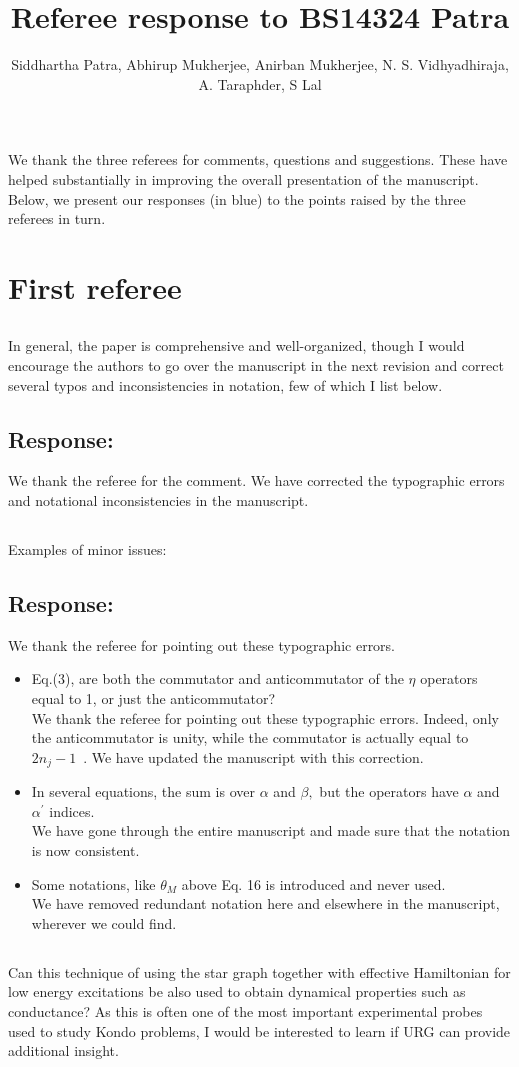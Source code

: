 \documentclass[11pt]{article}
\author{Siddhartha Patra, Abhirup Mukherjee, Anirban Mukherjee, N. S. Vidhyadhiraja,\\ A. Taraphder, S Lal}
\title{Referee response to BS14324 Patra}
\newcommand{\response}[1]{{\color{blue}\subsection*{Response:}{#1}}}
\newcommand{\point}[1]{\subsection{}{#1}}
\begin{document}
\maketitle

We thank the three referees for comments, questions and suggestions. These have helped substantially in improving the overall presentation of the manuscript. Below, we present our responses (in blue) to the points raised by the three referees in turn.

\section{First referee}

\point{In general, the paper is comprehensive and well-organized, though I would encourage the authors to go over the manuscript in the next revision and correct several typos and inconsistencies in notation, few of which I list below.}
\response{We thank the referee for the comment. We have corrected the typographic errors and notational inconsistencies in the manuscript.} 

\point{
Examples of minor issues:
\response{ We thank the referee for pointing out these typographic errors.} 
\begin{itemize}
	\item Eq.(3), are both the commutator and anticommutator of the $\eta$
operators equal to 1, or just the anticommutator?\\
{\color{blue}{\bf Response:} We thank the referee for pointing out these typographic errors. Indeed, only the anticommutator is unity, while the commutator is actually equal to $2\hat n_j - 1$~\cite{anirbanurg1}. We have updated the manuscript with this correction.}
	\item In several equations, the sum is over $\alpha$ and $\beta,$ but the operators have $\alpha$ and $\alpha^\prime$ indices.\\
{\color{blue}{\bf Response:} We have gone through the entire manuscript and made sure that the notation is now consistent.}
	\item Some notations, like $\theta_M$ above Eq. 16 is introduced and never
	used.\\
{\color{blue}{\bf Response:} We have removed redundant notation here and elsewhere in the manuscript, wherever we could find.}
\end{itemize}
}

\point{
Can this technique of using the star graph together with effective Hamiltonian for low energy excitations be also used to obtain dynamical properties such as conductance? As this is often one of the most important experimental probes used to study Kondo problems, I would be interested to learn if URG can provide additional insight.}
\end{document}
